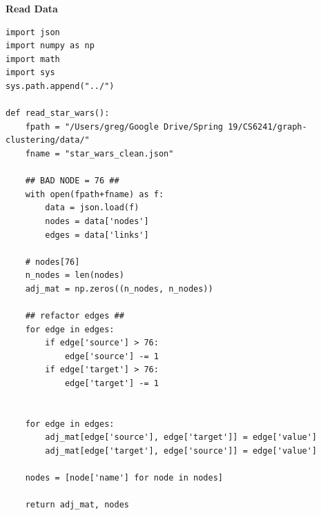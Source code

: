 \documentclass[12pt]{article} \usepackage[utf8]{inputenc}
\begin{document}
\textbf{Read Data}
\begin{lstlisting}
import json
import numpy as np
import math
import sys
sys.path.append("../")

def read_star_wars():
    fpath = "/Users/greg/Google Drive/Spring 19/CS6241/graph-clustering/data/"
    fname = "star_wars_clean.json"

    ## BAD NODE = 76 ##
    with open(fpath+fname) as f:
        data = json.load(f)
        nodes = data['nodes']
        edges = data['links']

    # nodes[76]
    n_nodes = len(nodes)
    adj_mat = np.zeros((n_nodes, n_nodes))

    ## refactor edges ##
    for edge in edges:
        if edge['source'] > 76:
            edge['source'] -= 1
        if edge['target'] > 76:
            edge['target'] -= 1


    for edge in edges:
        adj_mat[edge['source'], edge['target']] = edge['value']
        adj_mat[edge['target'], edge['source']] = edge['value']

    nodes = [node['name'] for node in nodes]

    return adj_mat, nodes
\end{lstlisting}
\nocite{*}


\end{document}
